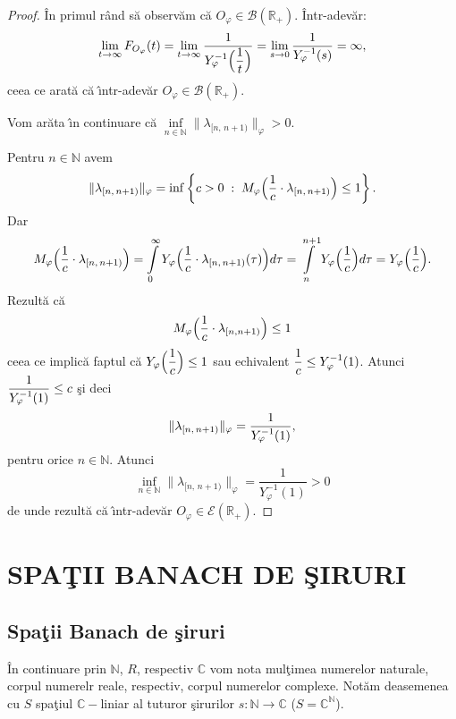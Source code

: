 \documentclass[ a4paper, 12pt]{report}
\theoremstyle{definition}
\theoremstyle{remark}
\numberwithin{equation}{section}
\begin{document}
\begin{proof} \^ In primul r\^ and s\u a observ\u am c\u a $O_\varphi \in \mathcal{B}(\mathbb{R}_+)$. \^ Intr-adev\u ar:
$$\lim\limits_{t \rightarrow \infty}F_{O_\varphi}(t) = \lim\limits_{t \rightarrow \infty} \frac{1}{Y_\varphi^{-1}\Big(\displaystyle\frac{1}{t}\Big)} =
\lim\limits_{s \rightarrow 0}  \displaystyle\frac{1}{Y_\varphi^{-1}(s)} = \infty,$$ ceea ce arat\u a c\u a \^\i ntr-adev\u ar $O_\varphi \in \mathcal{B}(\mathbb{R}_+).$

\smallskip

Vom ar\u ata \^\i n continuare c\u a $\inf\limits_{n \in \mathbb{N}} \lVert \lambda_{[n,\, n+1)} \rVert_\varphi > 0$.

Pentru $n \in \mathbb{N}$ avem
$$ \lVert \lambda_{[n,\, n+1)}\rVert_\varphi = \inf\left\{ c>0 \; : \; M_\varphi\Big(\displaystyle\frac{1}{c} \cdot \lambda_{[n,\, n+1)}\Big) \leq 1\right\}.$$ Dar
$$M_\varphi\Big(\displaystyle\frac{1}{c} \cdot \lambda_{[n,\, n+1)}\Big) = \int\limits_{0}^{\infty}Y_\varphi\Big(\displaystyle\frac{1}{c}\cdot \lambda_{[n,\, n+1)}(\tau)\Big)d\tau = \int\limits_{n}^{n+1}Y_\varphi\Big(\displaystyle\frac{1}{c}\Big) d\tau = Y_\varphi\Big(\displaystyle\frac{1}{c}\Big).$$ Rezult\u a c\u a
$$M_\varphi\Big(\displaystyle\frac{1}{c}\cdot \lambda_{[n,n+1)}\Big)\leq 1 $$ ceea ce implic\u a faptul c\u a $Y_\varphi\Big(\displaystyle\frac{1}{c}\Big) \leq 1$ sau echivalent $\displaystyle\frac{1}{c} \leq Y_\varphi^{-1}(1)$. Atunci $\displaystyle\frac{1}{Y_\varphi^{-1}(1)} \leq c$ \c si deci
$$\lVert \lambda_{[n,\, n+1)} \rVert_\varphi = \displaystyle\frac{1}{Y_\varphi^{-1}(1)},$$ pentru orice $n \in \mathbb{N}$. Atunci
$$ \inf\limits_{n \in \mathbb{N}}\lVert \lambda_{[n,\, n+1)}\rVert_\varphi = \frac{1}{Y_\varphi^{-1}(1)} > 0$$ de unde rezult\u a  c\u a \^\i ntr-adev\u ar $O_\varphi \in \mathcal{E}(\mathbb{R}_+)$.
\end{proof}




\chapter{SPA\c TII BANACH DE \c SIRURI}
\section{Spa\c tii Banach de \c siruri}

\^ In continuare prin $\mathbb{N}$, $R$, respectiv $\mathbb{C}$ vom nota mul\c timea numerelor naturale, corpul numerelr reale, respectiv, corpul numerelor complexe. Not\u am deasemenea cu $S$ spa\c tiul $\mathbb{C}-$liniar al tuturor \c sirurilor $s:\mathbb{N} \rightarrow \mathbb{C}$ ($S = {\mathbb{C}}^{\mathbb{N}}$).
\end{document}
